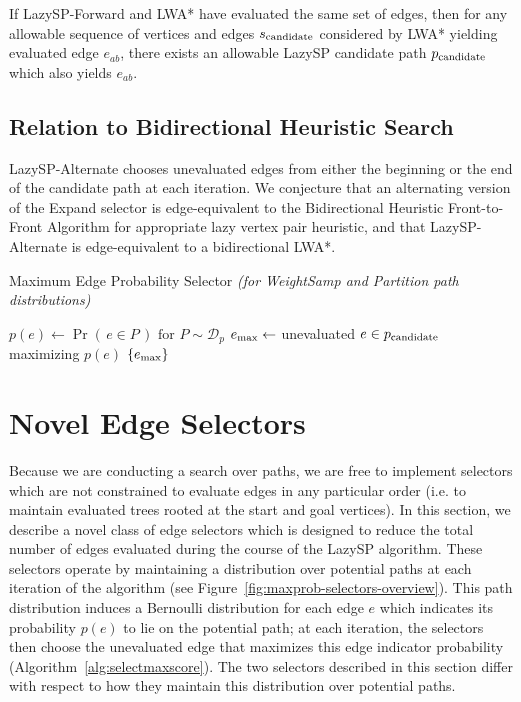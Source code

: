\begin{theorem}
If LazySP-Forward and LWA* have evaluated the same set of edges,
then for any allowable sequence of vertices and edges $s_{\mbox{\scriptsize candidate}}$
considered by LWA* yielding evaluated edge $e_{ab}$,
there exists an allowable LazySP candidate path $p_{\mbox{\scriptsize candidate}}$
which also yields $e_{ab}$.
\label{thm:lwastar-equiv-to-lazy}
\end{theorem}

\subsection{Relation to Bidirectional Heuristic Search}

LazySP-Alternate chooses unevaluated edges from either
the beginning or the end of the candidate path at each iteration.
We conjecture that an alternating version of the Expand selector
is edge-equivalent to the
Bidirectional Heuristic Front-to-Front Algorithm
\citep{champeauxsint1977bhffa}
for appropriate lazy vertex pair heuristic,
and that LazySP-Alternate is edge-equivalent
to a bidirectional LWA*.

\begin{algorithm}[t]
   \caption{Maximum Edge Probability Selector
      \emph{(for WeightSamp and Partition path distributions)}}
   \begin{algorithmic}[1]
   \State $p(e) \leftarrow \Pr( \, e \in P \, )
      \mbox{ for } P \sim \mathcal{D}_p$
   \State $e_{\mbox{\scriptsize max}} \leftarrow$ unevaluated $e \in p_{\mbox{\scriptsize candidate}}$
      maximizing $p(e)$
   \State \Return $\{ e_{\mbox{\scriptsize max}} \}$
   \EndFunction
   \end{algorithmic}
   \label{alg:selectmaxscore}
\end{algorithm}

\section{Novel Edge Selectors}

Because we are conducting a search over paths,
we are free to implement selectors which are not constrained to
evaluate edges in any particular order
(i.e. to maintain evaluated trees rooted at the start and goal
vertices).
In this section,
we describe a novel class of edge selectors which is designed
to reduce the total number of edges evaluated during the course
of the LazySP algorithm.
These selectors operate by maintaining a distribution over potential
paths at each iteration of the algorithm
(see Figure~\ref{fig:maxprob-selectors-overview}).
This path distribution induces a Bernoulli distribution for each
edge $e$ which indicates its probability $p(e)$ to lie on
the potential path;
at each iteration,
the selectors then choose the unevaluated edge that maximizes
this edge indicator probability (Algorithm~\ref{alg:selectmaxscore}).
The two selectors described in this section differ
with respect to how they maintain this distribution over potential paths.

